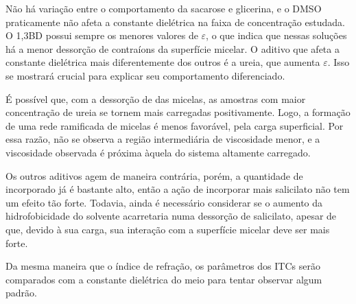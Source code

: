 		Não há variação entre o comportamento da sacarose e glicerina, e o DMSO praticamente não afeta a constante dielétrica na faixa de concentração estudada. O 1,3BD possui sempre os menores valores de \(\varepsilon\), o que indica que nessas soluções há a menor dessorção de contraíons da superfície micelar. O aditivo que afeta a constante dielétrica mais diferentemente dos outros é a ureia, que aumenta \(\varepsilon\). Isso se mostrará crucial para explicar seu comportamento diferenciado.
	
		É possível que, com a dessorção de \Sal{} das micelas, as amostras com maior concentração de ureia se tornem mais carregadas positivamente. Logo, a formação de uma rede ramificada de micelas é menos favorável, pela carga superficial. Por essa razão, não se observa a região intermediária de viscosidade menor, e a viscosidade observada é próxima àquela do sistema altamente carregado.
		
		Os outros aditivos agem de maneira contrária, porém, a quantidade de \Sal{} incorporado já é bastante alto, então a ação de incorporar mais salicilato não tem um efeito tão forte. %
		Todavia, ainda é necessário considerar se o aumento da hidrofobicidade do solvente acarretaria numa dessorção de salicilato, apesar de que, devido à sua carga, sua interação com a superfície micelar deve ser mais forte.
	
		Da mesma maneira que o índice de refração, os parâmetros dos ITCs serão comparados com a constante dielétrica do meio para tentar observar algum padrão.
		
